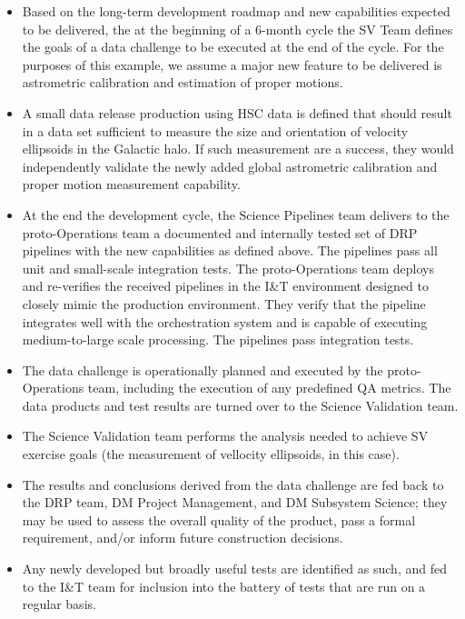 \begin{itemize}

\item Based on the long-term development roadmap and new capabilities
expected to be delivered, the at the beginning of a 6-month cycle the SV
Team defines the goals of a data challenge to be executed at the end of the
cycle.  For the purposes of this example, we assume a major new feature to
be delivered is astrometric calibration and estimation of proper motions.

\item A small data release production using HSC data is defined that
should result in a data set sufficient to measure the size and orientation
of velocity ellipsoids in the Galactic halo.  If such measurement are a
success, they would independently validate the newly added global
astrometric calibration and proper motion measurement capability.

\item At the end the development cycle, the Science Pipelines team delivers to the
proto-Operations team a documented and internally tested set of DRP
pipelines with the new capabilities as defined above.  The pipelines pass
all unit and small-scale integration tests.  The proto-Operations team
deploys and re-verifies the received pipelines in the I\&T environment
designed to closely mimic the production environment.  They verify that the
pipeline integrates well with the orchestration system and is capable of
executing medium-to-large scale processing.  The pipelines pass integration
tests.

\item The data challenge is operationally planned and executed by the
proto-Operations team, including the execution of any predefined QA metrics.
The data products and test results are turned over to the Science
Validation team.

\item The Science Validation team performs the analysis needed to achieve
SV exercise goals (the measurement of vellocity ellipsoids, in this case).

\item The results and conclusions derived from the data challenge are fed back to
the DRP team, DM Project Management, and DM Subsystem Science; they may be
used to assess the overall quality of the product, pass a formal
requirement, and/or inform future construction decisions.

\item Any newly developed but broadly useful tests are identified as such,
and fed to the I\&T team for inclusion into the battery of tests that are
run on a regular basis.

\end{itemize}
